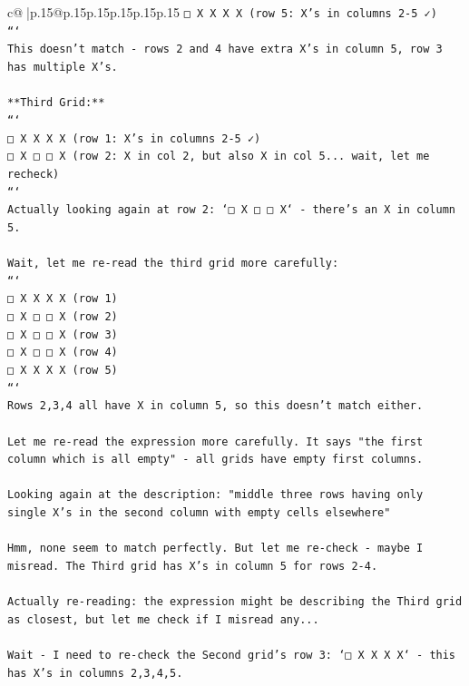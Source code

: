\documentclass{article}
\begin{document}
{\begin{supertabular}{c@{$\;$}|p{.15\linewidth}@{}p{.15\linewidth}p{.15\linewidth}p{.15\linewidth}p{.15\linewidth}p{.15\linewidth}}
{{{\texttt{□ X X X X  (row 5: X's in columns 2{-}5 ✓)} \\
\texttt{```} \\
\texttt{This doesn't match {-} rows 2 and 4 have extra X's in column 5, row 3 has multiple X's.} \\
\\ 
\texttt{**Third Grid:**} \\
\texttt{```} \\
\texttt{□ X X X X  (row 1: X's in columns 2{-}5 ✓)} \\
\texttt{□ X □ □ X  (row 2: X in col 2, but also X in col 5... wait, let me recheck)} \\
\texttt{```} \\
\texttt{Actually looking again at row 2: `□ X □ □ X` {-} there's an X in column 5.} \\
\\ 
\texttt{Wait, let me re{-}read the third grid more carefully:} \\
\texttt{```} \\
\texttt{□ X X X X  (row 1)} \\
\texttt{□ X □ □ X  (row 2)} \\
\texttt{□ X □ □ X  (row 3)} \\
\texttt{□ X □ □ X  (row 4)} \\
\texttt{□ X X X X  (row 5)} \\
\texttt{```} \\
\texttt{Rows 2,3,4 all have X in column 5, so this doesn't match either.} \\
\\ 
\texttt{Let me re{-}read the expression more carefully. It says "the first column which is all empty" {-} all grids have empty first columns. } \\
\\ 
\texttt{Looking again at the description: "middle three rows having only single X's in the second column with empty cells elsewhere"} \\
\\ 
\texttt{Hmm, none seem to match perfectly. But let me re{-}check {-} maybe I misread. The Third grid has X's in column 5 for rows 2{-}4.} \\
\\ 
\texttt{Actually re{-}reading: the expression might be describing the Third grid as closest, but let me check if I misread any...} \\
\\ 
\texttt{Wait {-} I need to re{-}check the Second grid's row 3: `□ X X X X` {-} this has X's in columns 2,3,4,5.} \\
}}}
\end{supertabular}}
\end{document}
